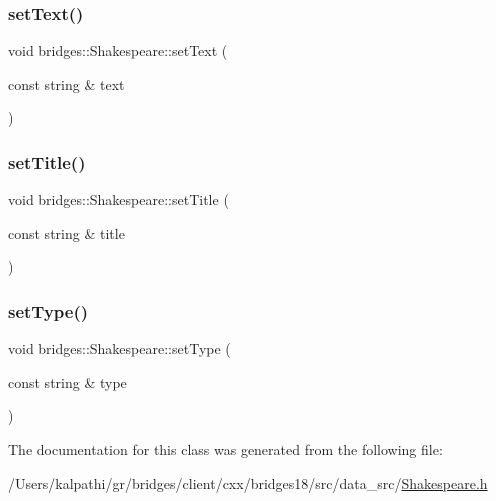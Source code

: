 \mbox{\label{classbridges_1_1_shakespeare_a220546925748e67c238411f1ee04d393}} 
\subsubsection{\texorpdfstring{set\+Text()}{setText()}}
{\footnotesize\ttfamily void bridges\+::\+Shakespeare\+::set\+Text (\begin{DoxyParamCaption}\item[{const string \&}]{text }\end{DoxyParamCaption})\hspace{0.3cm}{\ttfamily [inline]}}

\mbox{\label{classbridges_1_1_shakespeare_ad68bee03f37d3fae7ffa4c75946a6dfd}} 
\subsubsection{\texorpdfstring{set\+Title()}{setTitle()}}
{\footnotesize\ttfamily void bridges\+::\+Shakespeare\+::set\+Title (\begin{DoxyParamCaption}\item[{const string \&}]{title }\end{DoxyParamCaption})\hspace{0.3cm}{\ttfamily [inline]}}

\mbox{\label{classbridges_1_1_shakespeare_a683816de184cf1e999552e82bcbefa21}} 
\subsubsection{\texorpdfstring{set\+Type()}{setType()}}
{\footnotesize\ttfamily void bridges\+::\+Shakespeare\+::set\+Type (\begin{DoxyParamCaption}\item[{const string \&}]{type }\end{DoxyParamCaption})\hspace{0.3cm}{\ttfamily [inline]}}



The documentation for this class was generated from the following file\+:\begin{DoxyCompactItemize}
\item 
/\+Users/kalpathi/gr/bridges/client/cxx/bridges18/src/data\+\_\+src/\mbox{\hyperlink{_shakespeare_8h}{Shakespeare.\+h}}\end{DoxyCompactItemize}
